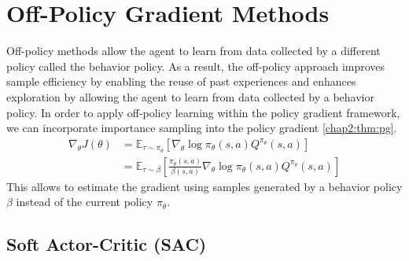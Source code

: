\section{Off-Policy Gradient Methods} \label{chap2:sec3}

Off-policy methods allow the agent to learn from data collected by a different policy called the behavior policy.
As a result, the off-policy approach improves sample efficiency by enabling the reuse of past experiences and enhances exploration by allowing the agent to learn from data collected by a behavior policy.
In order to apply off-policy learning within the policy gradient framework, we can incorporate importance sampling into the policy gradient \cref{chap2:thm:pg}.
\begin{equation}
  \begin{aligned}
    \nabla_\theta J(\theta)
    &= \mathbb{E}_{\tau \sim \pi_\theta} [\nabla_\theta \log \pi_\theta(s, a) Q^{\pi_\theta}(s, a)] \\
    &= \mathbb{E}_{\tau \sim \beta} \left[ \frac{\pi_\theta(s, a)}{\beta(s, a)} \nabla_\theta \log \pi_\theta(s, a) Q^{\pi_\theta}(s, a) \right]
  \end{aligned}
\end{equation}
This allows to estimate the gradient using samples generated by a behavior policy $\beta$ instead of the current policy $\pi_\theta$.

\subsection{Soft Actor-Critic (SAC)}

